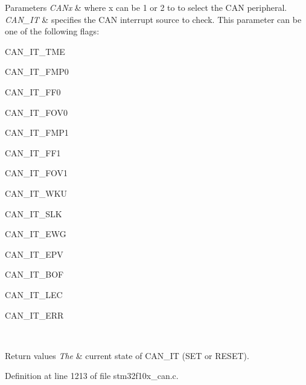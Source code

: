 \begin{DoxyParams}{Parameters}
{\em C\+A\+Nx} & where x can be 1 or 2 to to select the C\+AN peripheral. \\
\hline
{\em C\+A\+N\+\_\+\+IT} & specifies the C\+AN interrupt source to check. This parameter can be one of the following flags\+:
\begin{DoxyItemize}
\item C\+A\+N\+\_\+\+I\+T\+\_\+\+T\+ME
\item C\+A\+N\+\_\+\+I\+T\+\_\+\+F\+M\+P0
\item C\+A\+N\+\_\+\+I\+T\+\_\+\+F\+F0
\item C\+A\+N\+\_\+\+I\+T\+\_\+\+F\+O\+V0
\item C\+A\+N\+\_\+\+I\+T\+\_\+\+F\+M\+P1
\item C\+A\+N\+\_\+\+I\+T\+\_\+\+F\+F1
\item C\+A\+N\+\_\+\+I\+T\+\_\+\+F\+O\+V1
\item C\+A\+N\+\_\+\+I\+T\+\_\+\+W\+KU
\item C\+A\+N\+\_\+\+I\+T\+\_\+\+S\+LK
\item C\+A\+N\+\_\+\+I\+T\+\_\+\+E\+WG
\item C\+A\+N\+\_\+\+I\+T\+\_\+\+E\+PV
\item C\+A\+N\+\_\+\+I\+T\+\_\+\+B\+OF
\item C\+A\+N\+\_\+\+I\+T\+\_\+\+L\+EC
\item C\+A\+N\+\_\+\+I\+T\+\_\+\+E\+RR 
\end{DoxyItemize}\\
\hline
\end{DoxyParams}

\begin{DoxyRetVals}{Return values}
{\em The} & current state of C\+A\+N\+\_\+\+IT (S\+ET or R\+E\+S\+ET). \\
\hline
\end{DoxyRetVals}


Definition at line 1213 of file stm32f10x\+\_\+can.\+c.

\mbox{\label{group___c_a_n___exported___functions_gaaee721a392b6b21bfd15dc160aeb6924}} 
